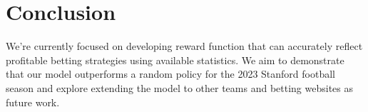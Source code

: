 \documentclass{article}
\begin{document}
\section*{Conclusion}

We’re currently focused on developing reward function that can accurately reflect profitable betting strategies using available statistics. We aim to demonstrate that our model outperforms a random policy for the 2023 
Stanford football season and explore extending the model to other teams and betting websites as future work.
\end{document}
